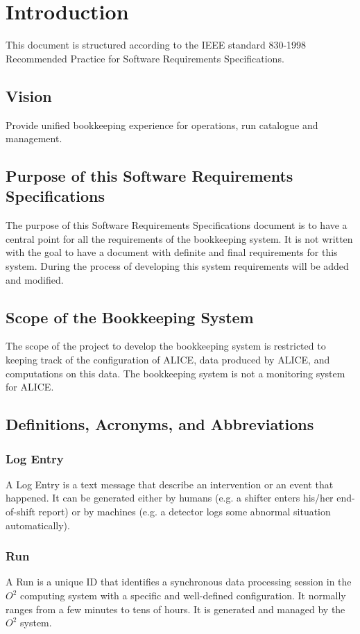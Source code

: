 
\chapter{Introduction}
This document is structured according to the IEEE standard 830-1998 Recommended Practice for Software Requirements Specifications.

\section{Vision}
 Provide unified bookkeeping experience for operations, run catalogue and management.
 
\section{Purpose of this Software Requirements Specifications}
The purpose of this Software Requirements Specifications document is to have a central point for all the requirements of the bookkeeping system. It is not written with the goal to have a document with definite and final requirements for this system. During the process of developing this system requirements will be added and modified.

\section{Scope of the Bookkeeping System}
The scope of the project to develop the bookkeeping system is restricted to keeping track of the configuration of ALICE, data produced by ALICE, and computations on this data. The bookkeeping system is not a monitoring system for ALICE.

\section{Definitions, Acronyms, and Abbreviations}

\subsection{Log Entry}
A Log Entry is a text message that describe an intervention or an event that happened. It can be generated either by humans (e.g. a shifter enters his/her end-of-shift report) or by machines (e.g. a detector logs some abnormal situation automatically). 

\subsection{Run}
A Run is a unique ID that identifies a synchronous data processing session in the $O^2$ computing system with a specific and well-defined configuration. It normally ranges from a few minutes to tens of hours. It is generated and managed by the $O^2$ system. 

